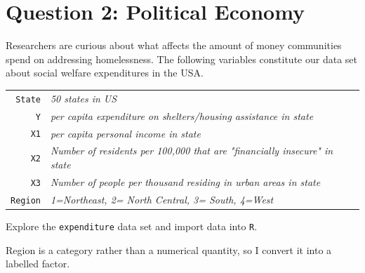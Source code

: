 \documentclass[12pt,letterpaper]{article}
\begin{document}
	\newpage
	
	\section*{Question 2: Political Economy}
	
	\noindent Researchers are curious about what affects the amount of money communities spend on addressing homelessness. The following variables constitute our data set about social welfare expenditures in the USA. \\
	\vspace{.5cm}
	
	
	\begin{tabular}{r|l}
		\texttt{State} &\emph{50 states in US} \\
		\texttt{Y} & \emph{per capita expenditure on shelters/housing assistance in state}\\
		\texttt{X1} &\emph{per capita personal income in state} \\
		\texttt{X2} &  \emph{Number of residents per 100,000 that are "financially insecure" in state}\\
		\texttt{X3} &  \emph{Number of people per thousand residing in urban areas in state} \\
		\texttt{Region} &  \emph{1=Northeast, 2= North Central, 3= South, 4=West} \\
	\end{tabular}
	
	\vspace{.5cm}
	\noindent Explore the \texttt{expenditure} data set and import data into \texttt{R}.
	\vspace{.5cm}
	
	Region is a category rather than a numerical quantity, so I convert it into a labelled factor.
	
	
	
\end{document}
